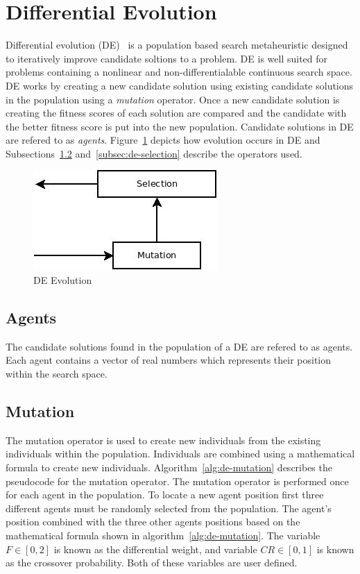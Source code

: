 \section{Differential Evolution}
\label{sec:de}

Differential evolution (DE)~\cite{storn1997differential} is a population based search metaheuristic designed to iteratively improve candidate soltions to a problem. DE is well suited for problems containing a nonlinear and non-differentialable continuous search space. DE works by creating a new candidate solution using existing candidate solutions in the population using a \textit{mutation} operator. Once a new candidate solution is creating the fitness scores of each solution are compared and the candidate with the better fitness score is put into the new population. Candidate solutions in DE are refered to as \textit{agents}. Figure~\ref{fig:deFlowchart} depicts how evolution occurs in DE and Subsections~\ref{subsec:de-mutation} and~\ref{subsec:de-selection} describe the operators used.

\begin{figure}[H]
  \centering
  \includegraphics[bb=0 0 266 144,scale=0.5]{figures/DE.jpeg}
  \caption{DE Evolution}
  \label{fig:deFlowchart}
\end{figure}

\subsection{Agents}

The candidate solutions found in the population of a DE are refered to as agents. Each agent contains a vector of real numbers which represents their position within the search space.

\subsection{Mutation}
\label{subsec:de-mutation}

The mutation operator is used to create new individuals from the existing individuals within the population. Individuals are combined using a mathematical formula to create new individuals. Algorithm~\ref{alg:de-mutation} describes the pseudocode for the mutation operator. The mutation operator is performed once for each agent in the population. To locate a new agent position first three different agents must be randomly selected from the population. The agent's position combined with the three other agents positions based on the mathematical formula shown in algorithm~\ref{alg:de-mutation}. The variable $F \in [0,2]$ is known as the differential weight, and variable $CR \in [0,1]$ is known as the crossover probability. Both of these variables are user defined.


